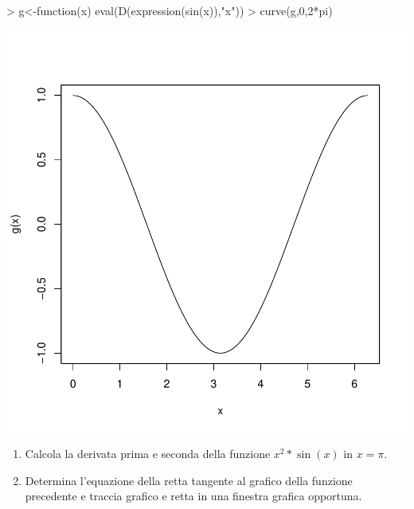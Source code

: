 \documentclass[onecolumn,11pt]{book}
\begin{document}
\begin{Schunk}
\begin{Sinput}
> g<-function(x) eval(D(expression(sin(x)),"x"))
> curve(g,0,2*pi)
\end{Sinput}
\end{Schunk}
\includegraphics{Rmatematica-128}
\begin{shaded}
\begin{enumerate}
 \item{} Calcola la derivata prima e seconda della funzione $x^2*\sin(x)$ in $x=\pi$.
 \item{} Determina l'equazione della retta tangente al grafico della funzione precedente e traccia grafico e retta in una finestra grafica opportuna.
\end{enumerate}
\end{shaded} 
\end{document}
